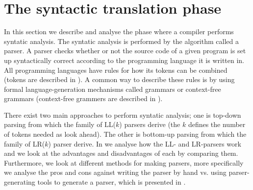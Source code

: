 \section{The syntactic translation phase}
\label{sec:syntacticanalysis}

In this section we describe and analyse the phase where a compiler performs
syntatic analysis. The syntatic analysis is performed by the algorithm called a
parser. A parser checks whether or not the source code of a given program is set
up syntactically correct according to the programming language it is written in.
All programming languages have rules for how its tokens can be combined (tokens
are described in ).  A common way to describe these
rules is by using formal language-generation mechanisms called grammars or
context-free grammars (context-free grammers are described in
). 

There exist two main approaches to perform syntatic analysis; one is top-down parsing
from which the family of LL($k$) parsers derive (the $k$ defines the number of
tokens needed as look ahead). The other is bottom-up parsing from which the
family of LR($k$) parser derive. In  we
analyse how the LL- and LR-parsers work and we look at the advantages and
disadvantages of each by comparing them. Furthermore, we look at different
methods for making parsers, more specifically we analyse the pros and cons
against writing the parser by hand vs. using parser-generating tools to generate
a parser, which is presented in .







